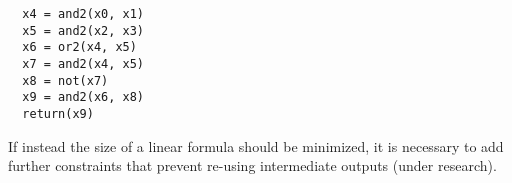 \documentclass[a4paper]{article}
\begin{document}
\begin{verbatim}
  x4 = and2(x0, x1)
  x5 = and2(x2, x3)
  x6 = or2(x4, x5)
  x7 = and2(x4, x5)
  x8 = not(x7)
  x9 = and2(x6, x8)
  return(x9)
\end{verbatim}

If instead the size of a linear formula should be minimized, it is necessary to add further constraints that prevent re-using intermediate outputs (under research).




\end{document}
